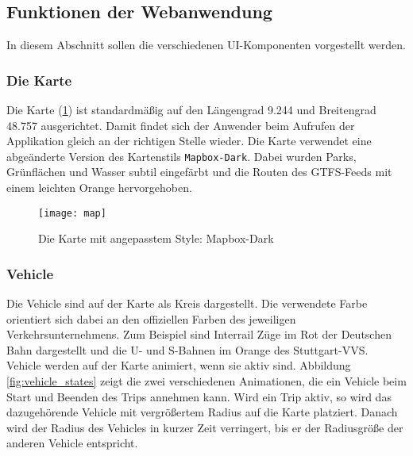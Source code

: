 \subsection{Funktionen der Webanwendung}
\label{sub:funktionen_der_webanwendung}
  In diesem Abschnitt sollen die verschiedenen UI-Komponenten vorgestellt werden.

  \subsubsection*{Die Karte}
  \label{ssub:die_karte}
    Die Karte (\ref{fig:map}) ist standardmäßig auf den Längengrad 9.244 und Breitengrad 48.757 ausgerichtet. Damit findet sich der Anwender beim Aufrufen der Applikation gleich an der richtigen Stelle wieder. Die Karte verwendet eine abgeänderte Version des Kartenstils \texttt{Mapbox-Dark}. Dabei wurden Parks, Grünflächen und Wasser subtil eingefärbt und die Routen des GTFS-Feeds mit einem leichten Orange hervorgehoben.

    \begin{figure}[htbp]
      \begin{center}
        \texttt{[image: map]}
        \caption{Die Karte mit angepasstem Style: Mapbox-Dark}
        \label{fig:map}
      \end{center}
    \end{figure}
    

  \subsubsection*{Vehicle}
  \label{ssub:vehicle_auf_karte}
    Die Vehicle sind auf der Karte als Kreis dargestellt. Die verwendete Farbe orientiert sich dabei an den offiziellen Farben des jeweiligen Verkehrsunternehmens. Zum Beispiel sind Interrail Züge im Rot der Deutschen Bahn dargestellt und die U- und S-Bahnen im Orange des Stuttgart-VVS.\\

    Vehicle werden auf der Karte animiert, wenn sie aktiv sind. Abbildung \ref{fig:vehicle_states} zeigt die zwei verschiedenen Animationen, die ein Vehicle beim Start und Beenden des Trips annehmen kann. Wird ein Trip aktiv, so wird das dazugehörende Vehicle mit vergrößertem Radius auf die Karte platziert. Danach wird der Radius des Vehicles in kurzer Zeit verringert, bis er der Radiusgröße der anderen Vehicle entspricht.

